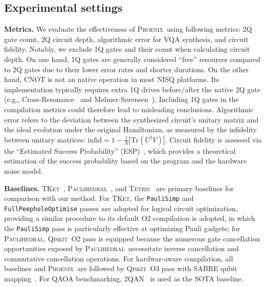 \documentclass[conference]{IEEEtran}
\newcommand{\dquote}[1]{``#1''}
\newcommand{\code}{\texttt}
\newcommand{\phoenix}{\textsc{Phoenix}}
\newcommand{\qiskit}{\textsc{Qiskit}}
\newcommand{\tket}{\textsc{TKet}}
\newcommand{\tetris}{\textsc{Tetris}}
\newcommand{\paulihedral}{\textsc{Paulihedral}}
\newcommand{\twoqan}{\textsc{2QAN}}
\newcommand{\CNOT}{\mathrm{CNOT}}
\begin{document}
\subsection{Experimental settings}
    
    \textbf{Metrics.} We evaluate the effectiveness of \phoenix\ using following metrics: 2Q gate count, 2Q circuit depth, algorithmic error for VQA synthesis, and circuit fidelity. Notably, we exclude 1Q gates and their count when calculating circuit depth. On one hand, 1Q gates are generally considered \dquote{free} resources compared to 2Q gates due to their lower error rates and shorter durations. On the other hand, $\CNOT$ is not an native operation in most NISQ platforms. Its implementation typically requires extra 1Q drives before/after the native 2Q gate (e.g., Cross-Resonance~\cite{rigetti2010fully} and Mølmer-Sørensen~\cite{bruzewicz2019trapped}). Including 1Q gates in the compilation metrics could therefore lead to misleading conclusions. Algorithmic error refers to the deviation between the synthesized circuit's unitary matrix and the ideal evolution under the original Hamiltonian, as measured by the infidelity between unitary matrices: $\mathrm{infid} = 1 - \frac{1}{N}|\mathrm{Tr}(U^\dagger V)|$. Circuit fidelity is assessed via the \dquote{Estimated Success Probability} (ESP)~\cite{magesan2011scalable}, which provides a theoretical estimation of the success probability based on the program and the hardware noise model.
    
    \textbf{Baselines.} \tket~\cite{sivarajah2020t}, \paulihedral~\cite{li2022paulihedral}, and \tetris~\cite{jin2024tetris} are primary baselines for comparison with our method. For \tket, the \code{PauliSimp} and \code{FullPeepholeOptimise} passes are adopted for logical circuit optimization, providing a similar procedure to its default O2 compilation is adopted, in which the \code{PauliSimp} pass is particularly effective at optimizing Pauli gadgets; for \paulihedral, \qiskit\ O2 pass is equipped because the numerous gate cancellation opportunities exposed by \paulihedral\ necessitate inverse cancellation and commutative cancellation operations. For hardwar-aware compilation, all baselines and \phoenix\ are followed by \qiskit\ O3 pass with SABRE qubit mapping~\cite{li2019tackling}. For QAOA benchmarking, \twoqan~\cite{lao20222qan} is used as the SOTA baseline.
\end{document}
